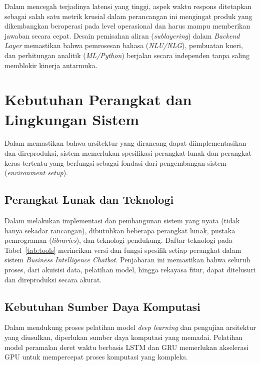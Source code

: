 Dalam mencegah terjadinya latensi yang tinggi, aspek waktu respons ditetapkan sebagai salah satu metrik krusial dalam perancangan ini mengingat produk yang dikembangkan beroperasi pada level operasional dan harus mampu memberikan jawaban secara cepat. Desain pemisahan aliran (\textit{sublayering}) dalam \textit{Backend Layer} memastikan bahwa pemrosesan bahasa (\textit{NLU/NLG}), pembuatan kueri, dan perhitungan analitik (\textit{ML/Python}) berjalan secara independen tanpa saling memblokir kinerja antarmuka.

\section{Kebutuhan Perangkat dan Lingkungan Sistem}
\label{sec:perangkat}

Dalam memastikan bahwa arsitektur yang dirancang dapat diimplementasikan dan direproduksi, sistem memerlukan spesifikasi perangkat lunak dan perangkat keras tertentu yang berfungsi sebagai fondasi dari pengembangan sistem (\textit{environment setup}).

\subsection{Perangkat Lunak dan Teknologi}
\label{subsec:tools}

Dalam melakukan implementasi dan pembangunan sistem yang nyata (tidak hanya sekadar rancangan), dibutuhkan beberapa perangkat lunak, pustaka pemrograman (\textit{libraries}), dan teknologi pendukung. Daftar teknologi pada Tabel~\ref{tab:tools} merincikan versi dan fungsi spesifik setiap perangkat dalam sistem \textit{Business Intelligence Chatbot}. Penjabaran ini memastikan bahwa seluruh proses, dari akuisisi data, pelatihan model, hingga rekayasa fitur, dapat ditelusuri dan direproduksi secara akurat.



\subsection{Kebutuhan Sumber Daya Komputasi}
\label{subsec:resources}

Dalam mendukung proses pelatihan model \textit{deep learning} dan pengujian arsitektur yang diusulkan, diperlukan sumber daya komputasi yang memadai. Pelatihan model peramalan deret waktu berbasis LSTM dan GRU memerlukan akselerasi GPU untuk mempercepat proses komputasi yang kompleks.

